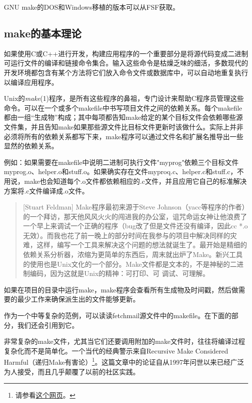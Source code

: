 \documentclass[12pt,oneside]{book}
\begin{document}
GNU make的DOS和Windows移植的版本可以从FSF获取。

\subsection{make的基本理论}
如果使用C或C++进行开发，构建应用程序的一个重要部分是将源代码变成二进制可运行文件的编译和链接命令集合。输入这些命令是枯燥乏味的细活，多数现代的开发环境都包含有某个方法将它们放入命令文件或数据库中，可以自动地重复执行以编译应用程序。

Unix的\textit{make}(1)程序，是所有这些程序的鼻祖，专门设计来帮助C程序员管理这些命令。可以在一个或多个makefile中书写项目文件之间的依赖关系。每个makefile都由一组“生成物”构成；其中每项都告知make给定的某个目标文件会依赖哪些源文件集，并且告知make如果那些源文件比目标文件更新时该做什么。实际上并非必须将所有的依赖关系都写下来，make程序可以通过文件名和扩展名推导出一些显然的依赖关系。

例如：如果需要在makefile中说明二进制可执行文件"myprog"依赖三个目标文件myprog.o、helper.o和stuff.o。如果确实存在文件myproq.c\linebreak 、helper.c和stuff.c，不用说，make也会知道每个.o文件都依赖相应的.c文件，并且应用它自己的标准解决方案将.c文件编译成.o文件。

\begin{quote}[Stuart Feldman]
Make程序最初来源于Steve Johnson（yacc等程序的作者）的一个拜访，那天他风风火火的闯进我的办公室，诅咒命运女神让他浪费了一个早上来调试一个正确的程序（bug改了但是文件还没有编译，因此cc *.o无效）。而我也花了前一晚上的部分时间在我参与的项目中解决同样的灾难，这样，编写一个工具来解决这个问题的想法就诞生了。最开始是精细的依赖关系分析器，浓缩为更简单的东西后，周末就出炉了Make。新兴工具的使用也是Unix文化的一个部分。Make文件都是文本的，不是神秘的二进制编码，因为这就是Unix的精神：可打印、可
调试、可理解。
\end{quote}

如果在项目的目录中运行make，make程序会查看所有生成物及时间戳，然后做需要的最少工作来确保派生出的文件能够更新。

作为一个中等复杂的范例，可以读读fetchmail源文件中的makefile。在下面的部分，我们还会引用到它。

非常复杂的make文件，尤其当它们还要调用附加的make文件时，往往将编译过程复杂化而不是简单化。一个当代的经典警示来自Recursive Make Considered Harmful（递归Make有害论）\footnote{请参看\href{http://www.tip.net.au/~millerp/rmch/recu-make-cons-harm.html}{这个网页}。}。这篇文章中的论证自从1997年问世以来已经广泛为人接受，而且几乎颠覆了以前的社区实践。
\end{document}
